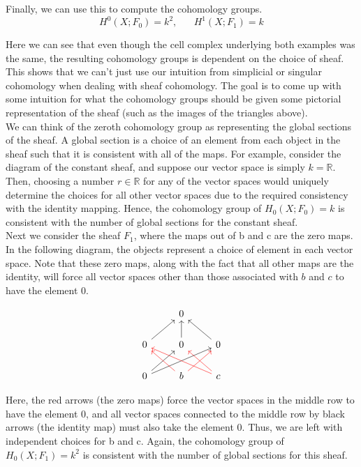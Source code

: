 \documentclass{article}
\newcommand{\R}{\mathbb{R}}
\begin{document}
Finally, we can use this to compute the cohomology groups.
\begin{equation}
H^0 (X; F_0) = k^2, \hspace{20pt} H^1(X; F_1) = k
\end{equation}

Here we can see that even though the cell complex underlying both examples was the same, the resulting cohomology groups is dependent on the choice of sheaf. This shows that we can’t just use our intuition from simplicial or singular cohomology when dealing with sheaf cohomology. The goal is to come up with some intuition for what the cohomology groups should be given some pictorial representation of the sheaf (such as the images of the triangles above).\\

We can think of the zeroth cohomology group as representing the global sections of the sheaf. A global section is a choice of an element from each object in the sheaf such that it is consistent with all of the maps. For example, consider the diagram of the constant sheaf, and suppose our vector space is simply $k = \R$. Then, choosing a number $r \in \R$ for any of the vector spaces would uniquely determine the choices for all other vector spaces due to the required consistency with the identity mapping. Hence, the cohomology group of $H_0(X;F_0) = k$ is consistent with the number of global sections for the constant sheaf.\\

Next we consider the sheaf $F_1$, where the maps out of b and c are the zero maps. In the following diagram, the objects represent a choice of element in each vector space. Note that these zero maps, along with the fact that all other maps are the identity, will force all vector spaces other than those associated with $b$ and $c$ to have the element 0.

\[
\begin{tikzcd}
	& 0 & \\
	0 \arrow{ur} & 0 \arrow{u} & 0 \arrow{ul} \\
	0 \arrow{ur} \arrow{urr} & b \arrow[red]{ur} \arrow[red]{ul} & c \arrow[red]{ul} \arrow[red]{ull}
\end{tikzcd}
\]

Here, the red arrows (the zero maps) force the vector spaces in the middle row to have the element 0, and all vector spaces connected to the middle row by black arrows (the identity map) must also take the element 0. Thus, we are left with independent choices for b and c. Again, the cohomology group of $H_0(X; F_1) = k^2$ is consistent with the number of global sections for this sheaf.
\end{document}
